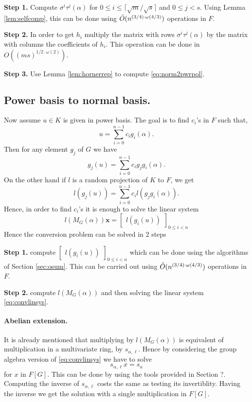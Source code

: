 \smallskip\noindent\textbf{Step 1.} Compute $\sigma^i\tau^j(\alpha)$
for $0 \leq i \leq \lceil \sqrt{m} /\sqrt{s} \rceil$ and $0 \leq j <
s$.  Using Lemma \ref{lem:selfcomp}, this can be done using
$\tilde{O}(n^{(3/4)\cdot \omega(4/3)})$ operations in $F$.

\smallskip\noindent\textbf{Step 2.} In order to get $h_{i}$ multiply
the matrix with rows $\sigma^i\tau^j(\alpha)$ by the matrix with
columns the coefficients of $h_{i}$. This operation can be done in
$O((ms)^{1/2 \cdot \omega(2)})$.

\smallskip\noindent\textbf{Step 3.} Use Lemma \ref{lem:hornerrep} to
compute \eqref{eq:norm2pwrpol}.

\subsection{Power basis to normal basis.}

Now assume $u \in K$ is given in power basis. The goal is to find $c_i$'s in $F$ such that, 
$$u = \sum_{i = 0}^{n-1} c_i g_i(\alpha).$$
Then for any element $g_j$ of $G$ we have
$$g_j(u) = \sum_{i = 0}^{n-1} c_i g_jg_i(\alpha).$$
On the other hand if $l$ is a random projection of $K$ to $F$, we get 
$$l(g_j(u)) = \sum_{i = 0}^{n-1} c_i l(g_jg_i(\alpha)).$$
Hence, in order to find $c_i$'s it is enough to solve the linear system
\begin{equation}\label{eq:convlinsys}
l(M_G(\alpha)) \textbf{x} = \begin{bmatrix} l(g_i(u)) \end{bmatrix}_{0 \leq i <n}
\end{equation}
Hence the conversion problem can be solved in 2 steps 

\smallskip\noindent\textbf{Step 1.} compute $\begin{bmatrix} l(g_i(u)) \end{bmatrix}_{0 \leq i <n}$ which can be done using
the algorithms of Section \ref{sec:osum}. This can be carried out using $\tilde{O}(n^{(3/4)\cdot \omega(4/3)})$ operations in $F$.

\smallskip\noindent\textbf{Step 2.} compute $l(M_G(\alpha))$ and then solving the linear system \eqref{eq:convlinsys}.

\paragraph{Abelian extension.}
It is already mentioned that multiplying by $l(M_G(\alpha))$ is equivalent of multiplication in a multivariate ring, by 
$s_{\alpha, \ell}$. Hence by considering the group algebra version of \eqref{eq:convlinsys} we have to solve $$s_{\alpha,\ell} x 
= s_u$$ for $x$ 
in $F[G]$. This can be done by using the tools provided in Section ?. Computing the inverse of $s_{\alpha,\ell}$ costs the same 
as testing its invertiblity. Having the inverse we get the solution with a single multiplication in $F[G]$.

